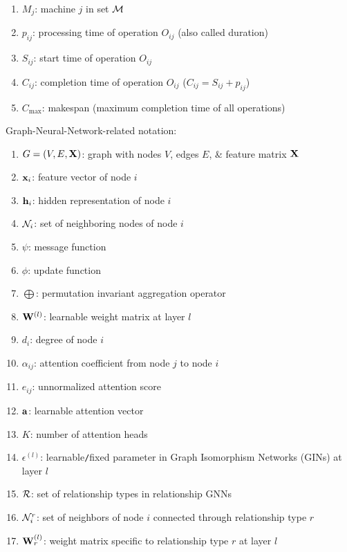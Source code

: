 \documentclass{article}
\begin{document}
\begin{itemize}
\begin{enumerate}
        \item $M_j$: machine $j$ in set ${\cal M}$
        \item $p_{ij}$: processing time of operation $O_{ij}$ (also called duration)
        \item $S_{ij}$: start time of operation $O_{ij}$
        \item $C_{ij}$: completion time of operation $O_{ij}$ ($C_{ij} = S_{ij} + p_{ij}$)
        \item $C_{\max}$: makespan (maximum completion time of all operations)
    \end{enumerate}
    Graph-Neural-Network-related notation:
    \begin{enumerate}
        \item $G = (V,E,{\bf X})$: graph with nodes $V$, edges $E$, \& feature matrix ${\bf X}$
        \item ${\bf x}_i$: feature vector of node $i$
        \item ${\bf h}_i$: hidden representation of node $i$
        \item ${\cal N}_i$: set of neighboring nodes of node $i$
        \item $\psi$: message function
        \item $\phi$: update function
        \item $\bigoplus$: permutation invariant aggregation operator
        \item ${\bf W}^{(l)}$: learnable weight matrix at layer $l$
        \item $d_i$: degree of node $i$
        \item $\alpha_{ij}$: attention coefficient from node $j$ to node $i$
        \item $e_{ij}$: unnormalized attention score
        \item ${\bf a}$: learnable attention vector
        \item $K$: number of attention heads
        \item $\epsilon^{(l)}$: learnable{\tt/}fixed parameter in Graph Isomorphism Networks (GINs) at layer $l$
        \item ${\cal R}$: set of relationship types in relationship GNNs
        \item ${\cal N}_i^r$: set of neighbors of node $i$ connected through relationship type $r$
        \item ${\bf W}_r^{(l)}$: weight matrix specific to relationship type $r$ at layer $l$
    \end{enumerate}

\end{itemize}
\end{document}
